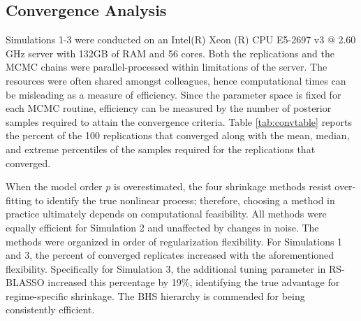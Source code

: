 \vskip 3mm

\subsection{Convergence Analysis}

Simulations 1-3 were conducted on an Intel(R) Xeon (R) CPU E5-2697 v3 @ 2.60 GHz server with 132GB of RAM and 56 cores. Both the replications and the MCMC chains were parallel-processed within limitations of the server. The resources were often shared amongst colleagues, hence computational times can be misleading as a measure of efficiency. Since the parameter space is fixed for each MCMC routine, efficiency can be measured by the number of posterior samples required to attain the convergence criteria. Table \ref{tab:convtable} reports the percent of the 100 replications that converged along with the mean, median, and extreme percentiles of the samples required for the replications that converged.

When the model order $p$ is overestimated, the four shrinkage methods resist over-fitting to identify the true nonlinear process; therefore, choosing a method in practice ultimately depends on computational feasibility. All methods were equally efficient for Simulation 2 and unaffected by changes in noise. The methods were organized in order of regularization flexibility. For Simulations 1 and 3, the percent of converged replicates increased with the aforementioned flexibility. Specifically for Simulation 3, the additional tuning parameter in RS-BLASSO increased this percentage by 19\%, identifying the true advantage for regime-specific shrinkage. The BHS hierarchy is commended for being consistently efficient.

